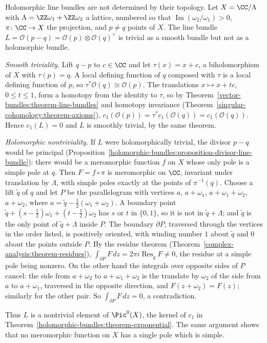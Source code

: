 \begin{counterexample}\label{holomorphic-bundles:counterexample-topologically-trivial}
Holomorphic line bundles are not determined by their topology. Let $X = \CC/\Lambda$ with $\Lambda = \ZZ\omega_1 + \ZZ\omega_2$ a lattice, numbered so that $\operatorname{Im}(\omega_2/\omega_1) > 0$, $\pi \colon \CC \to X$ the projection, and $p \neq q$ points of $X$. The line bundle
$L = \mathcal{O}(p - q) = \mathcal{O}(p) \otimes \mathcal{O}(q)^\vee$ is trivial as a smooth bundle but not as a holomorphic bundle.

\emph{Smooth triviality.} Lift $q - p$ to $c \in \CC$ and let $\tau(x) = x + c$, a biholomorphism of $X$ with $\tau(p) = q$. A local defining function of $q$ composed with $\tau$ is a local defining function of $p$, so
$\tau^*\mathcal{O}(q) \cong \mathcal{O}(p)$. The translations $x \mapsto x + tc$, $0 \leq t \leq 1$, form a homotopy from the identity to $\tau$, so by Theorem~\ref{vector-bundles:theorem-line-bundles} and homotopy
invariance (Theorem~\ref{singular-cohomology:theorem-axioms}), $c_1(\mathcal{O}(p)) = \tau^*c_1(\mathcal{O}(q)) = c_1(\mathcal{O}(q))$. Hence $c_1(L) = 0$ and $L$ is smoothly trivial, by the same theorem.

\emph{Holomorphic nontriviality.} If $L$ were holomorphically trivial, the divisor $p - q$ would be principal (Proposition~\ref{holomorphic-bundles:proposition-divisor-line-bundle}): there would be a meromorphic
function $f$ on $X$ whose only pole is a simple pole at $q$. Then $F = f \circ \pi$ is meromorphic on $\CC$, invariant under translation by $\Lambda$, with simple poles exactly at the points of $\pi^{-1}(q)$. Choose a lift
$\tilde q$ of $q$ and let $P$ be the parallelogram with vertices $a$, $a + \omega_1$, $a + \omega_1 + \omega_2$, $a + \omega_2$, where $a = \tilde q - \frac12(\omega_1 + \omega_2)$. A boundary point
$\tilde q + (s - \frac12)\omega_1 + (t - \frac12)\omega_2$ has $s$ or $t$ in $\{0, 1\}$, so it is not in $\tilde q + \Lambda$; and $\tilde q$ is the only point of $\tilde q + \Lambda$ inside $P$. The boundary $\partial P$, traversed through the vertices in the order listed, is positively oriented, with winding number $1$ about
$\tilde q$ and $0$ about the points outside $P$. By the residue theorem
(Theorem~\ref{complex-analysis:theorem-residues}), $\int_{\partial P}F\,dz = 2\pi i\operatorname{Res}_{\tilde q}F \neq 0$, the residue at a simple pole being nonzero. On the other hand the integrals over opposite sides of $P$
cancel: the side from $a + \omega_2$ to $a + \omega_1 + \omega_2$ is the translate by $\omega_2$ of the side from $a$ to $a + \omega_1$, traversed in the opposite direction, and $F(z + \omega_2) = F(z)$; similarly for the
other pair. So $\int_{\partial P}F\,dz = 0$, a contradiction.

Thus $L$ is a nontrivial element of $\Pic^0(X)$, the kernel of $c_1$ in Theorem~\ref{holomorphic-bundles:theorem-exponential}. The same argument shows that no meromorphic function on $X$ has a single pole which is simple.
\end{counterexample}

